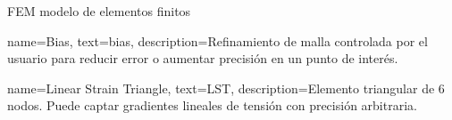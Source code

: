 \usepackage[sort=none,abbreviations]{glossaries-extra}

{FEM}
{modelo de elementos finitos}


{
	name=Bias,
	text=bias,
	description={Refinamiento de malla controlada por el usuario para reducir error o aumentar precisión en un punto de interés.}
}

{
	name=Linear Strain Triangle,
	text=LST,
	description={Elemento triangular de 6 nodos. Puede captar gradientes lineales de tensión con precisión arbitraria.}
}
